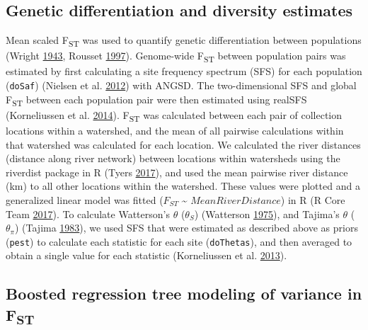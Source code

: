 \documentclass[proquest,12pt,final]{ucthesis-CA2012} %
\begin{document}
\begin{ucmainmatter}
\hypertarget{genetic-differentiation-and-diversity-estimates}{%
\subsection{Genetic differentiation and diversity
estimates}\label{genetic-differentiation-and-diversity-estimates}}

Mean scaled F\textsubscript{ST} was used to quantify genetic
differentiation between populations (Wright
\protect\hyperlink{ref-wright_isolation_1943}{1943}, Rousset
\protect\hyperlink{ref-rousset_genetic_1997}{1997}). Genome-wide
F\textsubscript{ST} between population pairs was estimated by first
calculating a site frequency spectrum (SFS) for each population
(\texttt{doSaf}) (Nielsen et al.
\protect\hyperlink{ref-nielsen_snp_2012}{2012}) with ANGSD. The
two-dimensional SFS and global F\textsubscript{ST} between each
population pair were then estimated using realSFS (Korneliussen et al.
\protect\hyperlink{ref-korneliussen_angsd_2014}{2014}).
F\textsubscript{ST} was calculated between each pair of collection
locations within a watershed, and the mean of all pairwise calculations
within that watershed was calculated for each location. We calculated
the river distances (distance along river network) between locations
within watersheds using the riverdist package in R (Tyers
\protect\hyperlink{ref-tyers_riverdist_2017}{2017}), and used the mean
pairwise river distance (km) to all other locations within the
watershed. These values were plotted and a generalized linear model was
fitted (\(F_{ST}\) \textasciitilde{} \(Mean River Distance\)) in R (R
Core Team \protect\hyperlink{ref-r_core_team_r_2017}{2017}). To
calculate Watterson's \(\theta\) (\(\theta_S\)) (Watterson
\protect\hyperlink{ref-watterson_number_1975}{1975}), and Tajima's
\(\theta\) (\(\theta_\pi\)) (Tajima
\protect\hyperlink{ref-tajima_evolutionary_1983}{1983}), we used SFS
that were estimated as described above as priors (\texttt{pest}) to
calculate each statistic for each site (\texttt{doThetas}), and then
averaged to obtain a single value for each statistic (Korneliussen et
al. \protect\hyperlink{ref-korneliussen_calculation_2013}{2013}).

\hypertarget{boosted-regression-tree-modeling-of-variance-in-fst}{%
\subsection{\texorpdfstring{Boosted regression tree modeling of variance
in
F\textsubscript{ST}}{Boosted regression tree modeling of variance in FST}}\label{boosted-regression-tree-modeling-of-variance-in-fst}}


\end{ucmainmatter}
\end{document}
